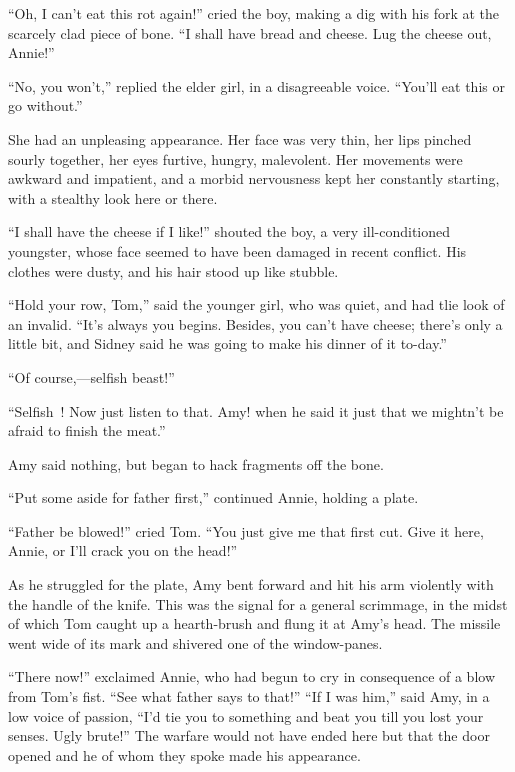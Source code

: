 ``Oh, I can't eat this rot again!'' cried the boy, making a dig with his
fork at the scarcely clad piece of bone. ``I shall have bread and
cheese. Lug the cheese out, Annie!''

``No, you won't,'' replied the elder girl, in a disagreeable voice.
``You'll eat this or go without.''

She had an unpleasing appearance. Her face was very thin, her lips
pinched sourly together, her eyes furtive, hungry, malevolent. Her
movements were awkward and impatient, and a morbid nervousness kept her
constantly starting, with a stealthy look here or there.

``I shall have the cheese if I like!'' shouted the boy, a very
ill-conditioned youngster, whose face seemed to have been damaged in
recent conflict. His clothes were dusty, and his hair stood up like
stubble.

``Hold your row, Tom,'' said the younger {\protect\hypertarget{254}{}{}}
girl, who was quiet, and had tlie look of an invalid. ``It's always you
begins. Besides, you can't have cheese; there's only a little bit, and
Sidney said he was going to make his dinner of it to-day.''

``Of course,---selfish beast!''

``Selfish~! Now just listen to that. Amy! when he said it just that we
mightn't be afraid to finish the meat.''

Amy said nothing, but began to hack fragments off the bone.

``Put some aside for father first,'' continued Annie, holding a plate.

``Father be blowed!'' cried Tom. ``You just give me that first cut. Give
it here, Annie, or I'll crack you on the head!''

As he struggled for the plate, Amy bent forward and hit his arm
violently with the handle of the knife. This was the signal for a
general scrimmage, in the midst of which Tom caught up a hearth-brush
and flung it at Amy's head. The missile went wide of its mark and
shivered one of the window-panes.

``There now!'' exclaimed Annie, who had begun to cry in consequence of a
blow from Tom's fist. ``See what father says to that!''
{\protect\hypertarget{255}{}{}} ``If I was him,'' said Amy, in a low
voice of passion, ``I'd tie you to something and beat you till you lost
your senses. Ugly brute!'' The warfare would not have ended here but
that the door opened and he of whom they spoke made his appearance.

